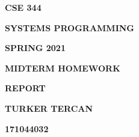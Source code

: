 \documentclass[12pt]{report}
\renewcommand{\_}{\kern-1.5pt\textunderscore\kern-1.5pt}
\begin{document}
\vspace{\baselineskip}

\vspace{\baselineskip}

\vspace{\baselineskip}
\begin{Center}
{\fontsize{24pt}{28.8pt}\selectfont \textbf{CSE 344}}
\end{Center}
\begin{Center}
{\fontsize{24pt}{28.8pt}\selectfont \textbf{SYSTEMS PROGRAMMING}}
\end{Center}
\begin{Center}
{\fontsize{24pt}{28.8pt}\selectfont \textbf{SPRING 2021}}
\end{Center}

\vspace{\baselineskip}
\begin{Center}
{\fontsize{24pt}{28.8pt}\selectfont \textbf{MIDTERM HOMEWORK}}
\end{Center}
\begin{Center}
{\fontsize{24pt}{28.8pt}\selectfont \textbf{REPORT}}
\end{Center}

\vspace{\baselineskip}
\begin{Center}
{\fontsize{24pt}{28.8pt}\selectfont \textbf{TURKER TERCAN}}
\end{Center}
\begin{Center}
{\fontsize{24pt}{28.8pt}\selectfont \textbf{171044032}}
\end{Center}

\vspace{\baselineskip}

\vspace{\baselineskip}

\vspace{\baselineskip}
\end{document}
